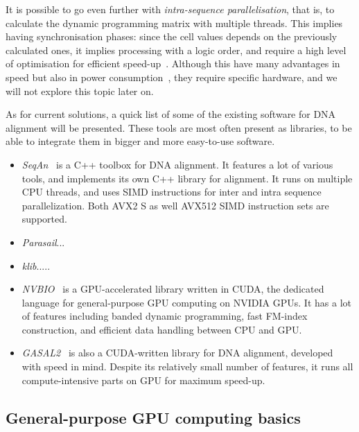 It is possible to go even further with \emph{intra-sequence parallelisation}, that is, to calculate the dynamic programming matrix with multiple threads. This implies having synchronisation phases: since the cell values depends on the previously calculated ones, it implies processing with a logic order, and require a high level of optimisation for efficient speed-up~\cite{Houtgast:gpu-accelerated}. Although this have many advantages in speed but also in power consumption~\cite{Houtgast:power-efficiency}, they require specific hardware, and we will not explore this topic later on.

As for current solutions, a quick list of some of the existing software for DNA alignment will be presented. These tools are most often present as libraries, to be able to integrate them in bigger and more easy-to-use software.

\begin{itemize}
    \item \emph{SeqAn}~\cite{Doring:seqan} is a C++ toolbox for DNA alignment. It features a lot of various tools, and implements its own C++ library for alignment. It runs on multiple CPU threads, and uses SIMD instructions for inter and intra sequence parallelization. Both AVX2 S as well AVX512 SIMD instruction sets are supported.
    
    \item \emph{Parasail}...
    
    \item \emph{klib}.....
    \item \emph{NVBIO}~\cite{nvidia:nvbio} is a GPU-accelerated library written in CUDA, the dedicated language for general-purpose GPU computing on NVIDIA GPUs. It has a lot of features including banded dynamic programming, fast FM-index construction, and efficient data handling between CPU and GPU.
    \item \emph{GASAL2}~\cite{Ahmed:gasal2} is also a CUDA-written library for DNA alignment, developed with speed in mind. Despite its relatively small number of features, it runs all compute-intensive parts on GPU for maximum speed-up.
\end{itemize}



\subsection{General-purpose GPU computing basics}

